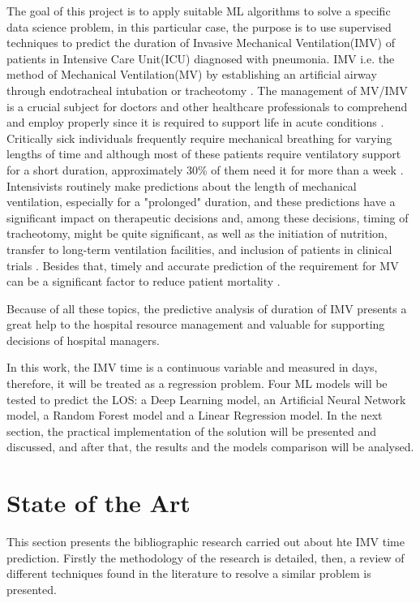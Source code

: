 \documentclass[journal]{IEEEtran} %
\begin{document}
The goal of this project is to apply suitable ML algorithms to solve a specific data science problem, in this particular case, the purpose is to use supervised techniques to predict the duration of Invasive Mechanical Ventilation(IMV) of patients in Intensive Care Unit(ICU) diagnosed with pneumonia. IMV i.e. the method of Mechanical Ventilation(MV) by establishing an artificial airway through endotracheal intubation or tracheotomy \cite{Wang2023}. The management of MV/IMV is a crucial subject for doctors and other healthcare professionals to comprehend and employ properly since it is required to support life in acute conditions \cite{Hickey2022}. Critically sick individuals frequently require mechanical breathing for varying lengths of time and although most of these patients require ventilatory support for a short duration, approximately 30\% of them need it for more than a week \cite{Casas2015}. Intensivists routinely make predictions about the length of mechanical ventilation, especially for a "prolonged" duration, and these predictions have a significant impact on therapeutic decisions and, among these decisions, timing of tracheotomy, might be quite significant, as well as the initiation of nutrition, transfer to long-term ventilation facilities, and inclusion of patients in clinical trials \cite{Casas2015}. Besides that, timely and accurate prediction of the requirement for MV can be a significant factor to reduce patient mortality \cite{Wang2023}.

Because of all these topics, the predictive analysis of duration of IMV presents a great help to the hospital resource
management and valuable for supporting decisions of hospital
managers.

In this work, the IMV time is a continuous variable and measured in days, therefore, it will be treated as a regression problem. Four ML models will be tested to predict the LOS: a Deep Learning model, an Artificial Neural Network model, a Random Forest model and a Linear Regression model. In the next section, the practical implementation of the solution will be presented and discussed, and after that, the results and the models comparison will be analysed.

\section{State of the Art}

This section presents the bibliographic research carried out about hte IMV time prediction. Firstly the methodology of the research is detailed, then, a review of different techniques found in the literature to resolve a similar problem is presented.
\end{document}

